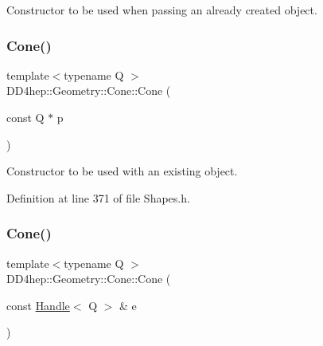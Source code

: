 Constructor to be used when passing an already created object. 

\hypertarget{class_d_d4hep_1_1_geometry_1_1_cone_a064cb39d46e1c66c6e596e60697a10fe}{}\label{class_d_d4hep_1_1_geometry_1_1_cone_a064cb39d46e1c66c6e596e60697a10fe} 
\subsubsection{\texorpdfstring{Cone()}{Cone()}\hspace{0.1cm}{\footnotesize\ttfamily [3/6]}}
{\footnotesize\ttfamily template$<$typename Q $>$ \\
D\+D4hep\+::\+Geometry\+::\+Cone\+::\+Cone (\begin{DoxyParamCaption}\item[{const Q $\ast$}]{p }\end{DoxyParamCaption})\hspace{0.3cm}{\ttfamily [inline]}}



Constructor to be used with an existing object. 



Definition at line 371 of file Shapes.\+h.

\hypertarget{class_d_d4hep_1_1_geometry_1_1_cone_a897427f767f40ea1443ab927a6893f89}{}\label{class_d_d4hep_1_1_geometry_1_1_cone_a897427f767f40ea1443ab927a6893f89} 
\subsubsection{\texorpdfstring{Cone()}{Cone()}\hspace{0.1cm}{\footnotesize\ttfamily [4/6]}}
{\footnotesize\ttfamily template$<$typename Q $>$ \\
D\+D4hep\+::\+Geometry\+::\+Cone\+::\+Cone (\begin{DoxyParamCaption}\item[{const \hyperlink{class_d_d4hep_1_1_handle}{Handle}$<$ Q $>$ \&}]{e }\end{DoxyParamCaption})\hspace{0.3cm}{\ttfamily [inline]}}



